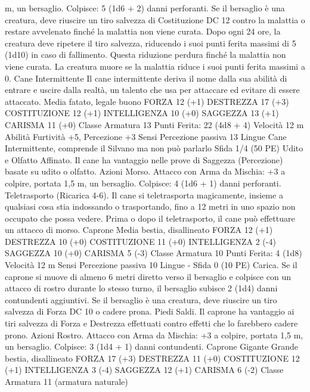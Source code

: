 \begin{multicols}{2}
m, un bersaglio.
Colpisce: 5 (1d6 + 2) danni perforanti. Se il bersaglio è una
creatura, deve riuscire un tiro salvezza di Costituzione DC 12
contro la malattia o restare avvelenato finché la malattia non
viene curata. Dopo ogni 24 ore, la creatura deve ripetere il tiro
salvezza, riducendo i suoi punti ferita massimi di 5 (1d10) in
caso di fallimento. Questa riduzione perdura finché la malattia
non viene curata. La creatura muore se la malattia riduce i suoi
punti ferita massimi a 0.
Cane Intermittente
Il cane intermittente deriva il nome dalla sua abilità di
entrare e uscire dalla realtà, un talento che usa per
attaccare ed evitare di essere attaccato.
Media fatato, legale buono
FORZA 12 (+1)
DESTREZZA 17 (+3)
COSTITUZIONE 12 (+1)
INTELLIGENZA 10 (+0)
SAGGEZZA 13 (+1)
CARISMA 11 (+0)
Classe Armatura 13
\hspace*{0pt}\hfill{Punti Ferita}: 22 (4d8 + 4)
Velocità 12 m
Abilità Furtività +5, Percezione +3
Sensi Percezione passiva 13
Lingue Cane Intermittente, comprende il Silvano ma non può
parlarlo
Sfida 1/4 (50 PE)
Udito e Olfatto Affinato. Il cane ha vantaggio nelle prove di
Saggezza (Percezione) basate su udito o olfatto.
Azioni
Morso. Attacco con Arma da Mischia: +3 a colpire, portata 1,5
m, un bersaglio.
Colpisce: 4 (1d6 + 1) danni perforanti.
Teletrasporto (Ricarica 4-6). Il cane si teletrasporta
magicamente, insieme a qualsiasi cosa stia indossando o
trasportando, fino a 12 metri in uno spazio non occupato che
possa vedere. Prima o dopo il teletrasporto, il cane può effettuare
un attacco di morso.
Caprone
Media bestia, disallineato
FORZA 12 (+1)
DESTREZZA 10 (+0)
COSTITUZIONE 11 (+0)
INTELLIGENZA 2 (-4)
SAGGEZZA 10 (+0)
CARISMA 5 (-3)
Classe Armatura 10
\hspace*{0pt}\hfill{Punti Ferita}: 4 (1d8)
Velocità 12 m
Sensi Percezione passiva 10
Lingue -
Sfida 0 (10 PE)
Carica. Se il caprone si muove di almeno 6 metri diretto verso il
bersaglio e colpisce con un attacco di rostro durante lo stesso
turno, il bersaglio subisce 2 (1d4) danni contundenti aggiuntivi.
Se il bersaglio è una creatura, deve riuscire un tiro salvezza di
Forza DC 10 o cadere prona.
Piedi Saldi. Il caprone ha vantaggio ai tiri salvezza di Forza e
Destrezza effettuati contro effetti che lo farebbero cadere prono.
Azioni
Rostro. Attacco con Arma da Mischia: +3 a colpire, portata 1,5
m, un bersaglio.
Colpisce: 3 (1d4 + 1) danni contundenti.
Caprone Gigante
Grande bestia, disallineato
FORZA 17 (+3)
DESTREZZA 11 (+0)
COSTITUZIONE 12 (+1)
INTELLIGENZA 3 (-4)
SAGGEZZA 12 (+1)
CARISMA 6 (-2)
Classe Armatura 11 (armatura naturale)

\end{multicols}
